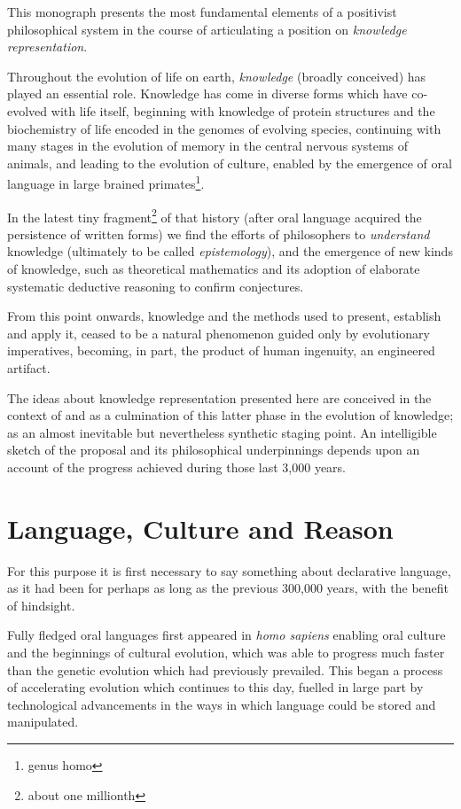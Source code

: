 
This monograph presents the most fundamental elements of a positivist philosophical system in the course of articulating a position on \emph{knowledge representation}.

Throughout the evolution of life on earth, \emph{knowledge} (broadly  conceived) has played an essential role.
Knowledge has come in diverse forms which have co-evolved with life itself, beginning with knowledge of protein structures and the biochemistry of life encoded in the genomes of evolving species, continuing with many stages in the evolution of memory in the central nervous systems of animals, and leading to the evolution of culture, enabled by the emergence of oral language in large brained primates\footnote{genus homo}.

In the latest tiny fragment\footnote{about one millionth} of that history (after oral language acquired the persistence of written forms) we find the efforts of philosophers to \emph{understand} knowledge (ultimately to be called \emph{epistemology}), and the emergence of new kinds of knowledge, such as theoretical mathematics and its adoption of elaborate systematic deductive reasoning to confirm conjectures.

From this point onwards, knowledge and the methods used to present, establish and apply it, ceased to be a natural phenomenon guided only by evolutionary imperatives, becoming, in part, the product of human ingenuity, an engineered artifact.

The ideas about knowledge representation presented here are conceived in the context of and as a culmination of this latter phase in the evolution of knowledge; as an almost inevitable but nevertheless synthetic staging point.
An intelligible sketch of the proposal and its philosophical underpinnings depends upon an account of the progress achieved during those last 3,000 years.

\section{Language, Culture and Reason}

For this purpose it is first necessary to say something about declarative language, as it had been for perhaps as long as the previous 300,000 years, with the benefit of hindsight.

Fully fledged oral languages first appeared in \emph{homo sapiens} enabling oral culture and the beginnings of cultural evolution, which was able to progress much faster than the genetic evolution which had previously prevailed.
This began a process of accelerating evolution which continues to this day, fuelled in large part by technological advancements in the ways in which language could be stored and manipulated.

